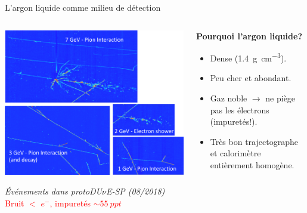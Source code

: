     \begin{frame}{L'argon liquide comme milieu de détection}
        \begin{scriptsize}
           	\begin{columns}
           		\begin{column}{0.6\textwidth}
           			\centering
           			\includegraphics[width=\textwidth]{./pictures/SP_evt.png}\\
           			\flushleft
           			\begin{footnotesize}\textit{Événements dans protoDU$\nu$E-SP (08/2018)}\\
           			\textcolor{red}{Bruit $<$  $e^{-}$, impuretés $\sim\SI{55}{ppt}$}\end{footnotesize}
           		\end{column}
           		\begin{column}{0.4\textwidth}
           			\begin{footnotesize}
           				\textbf{Pourquoi l'argon liquide?}
           			\end{footnotesize}
           			\begin{itemize}
           				\item Dense (\SI{1.4}{\gram\per\centi\meter^3}).
           				\item Peu cher et abondant.
           				\item Gaz noble $\rightarrow$ ne piège pas les électrons (\danger impuretés!).
           				\item Très bon trajectographe et calorimètre entièrement homogène.

\end{itemize}
\end{column}
\end{columns}
\end{scriptsize}
\end{frame}
